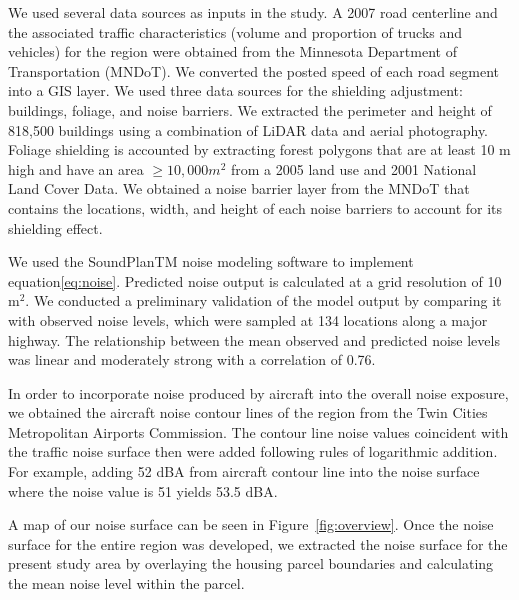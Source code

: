 \documentclass{article}\usepackage{graphicx, color}
\begin{document}
We used several data sources as inputs in the study.  A 2007 road centerline and the associated traffic characteristics (volume and proportion of trucks and vehicles) for the region were obtained from the Minnesota Department of Transportation (MNDoT).  We converted the posted speed of each road segment into a GIS layer.  We used three data sources for the shielding adjustment: buildings, foliage, and noise barriers.  We extracted the perimeter and height of 818,500 buildings using a combination of LiDAR data and aerial photography.  Foliage shielding is accounted by extracting forest polygons that are at least 10 m high and have an area $\geq 10,000 m^2$ from a 2005 land use and 2001 National Land Cover Data. We obtained a noise barrier layer from the MNDoT that contains the locations, width, and height of each noise barriers to account for its shielding effect. 

We used the SoundPlanTM noise modeling software to implement equation\ref{eq:noise}.  Predicted noise output is calculated at a grid resolution of 10 m$^2$.  We conducted a preliminary validation of the model output by comparing it with observed noise levels, which were sampled at 134 locations along a major highway. The relationship between the mean observed and predicted noise levels was linear and moderately strong with a correlation of 0.76.

In order to incorporate noise produced by aircraft into the overall noise exposure, we obtained the aircraft noise contour lines of the region from the Twin Cities Metropolitan Airports Commission. The contour line noise values coincident with the traffic noise surface then were added following rules of logarithmic addition. For example, adding 52 dBA from aircraft contour line into the noise surface where the noise value is 51 yields 53.5 dBA. 

A map of our noise surface can be seen in Figure~\ref{fig:overview}. Once the noise surface for the entire region was developed, we extracted the noise surface for the present study area by overlaying the housing parcel boundaries and calculating the mean noise level within the parcel. 
\end{document}
